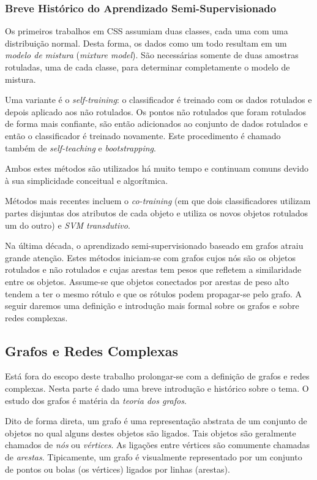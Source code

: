 \documentclass[12pt]{article}
\begin{document}
\subsubsection{Breve Histórico do Aprendizado Semi-Supervisionado}
Os primeiros trabalhos em CSS assumiam duas classes, cada uma com uma distribuição normal. Desta forma, os dados como um todo resultam em um \emph{modelo de mistura} (\emph{mixture model}). São necessárias somente de duas amostras rotuladas, uma de cada classe, para determinar completamente o modelo de mistura.

Uma variante é o \emph{self-training}: o classificador é treinado com os dados rotulados e depois aplicado aos não rotulados. Os pontos não rotulados que foram rotulados de forma mais confiante, são então adicionados ao conjunto de dados rotulados e então o classificador é treinado novamente. Este procedimento é chamado também de \emph{self-teaching} e \emph{bootstrapping}.

Ambos estes métodos são utilizados há muito tempo e continuam comuns devido à sua simplicidade conceitual e algorítmica.

Métodos mais recentes incluem o \emph{co-training} (em que dois classificadores utilizam partes disjuntas dos atributos de cada objeto e utiliza os novos objetos rotulados um do outro) e \emph{SVM transdutivo}.

Na última década, o aprendizado semi-supervisionado baseado em grafos atraiu grande atenção. Estes métodos iniciam-se com grafos cujos nós são os objetos rotulados e não rotulados e cujas arestas tem pesos que refletem a similaridade entre os objetos. Assume-se que objetos conectados por arestas de peso alto tendem a ter o mesmo rótulo e que os rótulos podem propagar-se pelo grafo. A seguir daremos uma definição e introdução mais formal sobre os grafos e sobre redes complexas.

\subsection{Grafos e Redes Complexas}
Está fora do escopo deste trabalho prolongar-se com a definição de grafos e redes complexas. Nesta parte é dado uma breve introdução e histórico sobre o tema. O estudo dos grafos é matéria da \emph{teoria dos grafos}.

Dito de forma direta, um grafo é uma representação abstrata de um conjunto de objetos no qual alguns destes objetos são ligados. Tais objetos são geralmente chamados de \emph{nós} ou \emph{vértices}. As ligações entre vértices são comumente chamadas de \emph{arestas}. Tipicamente, um grafo é visualmente representado por um conjunto de pontos ou bolas (os vértices) ligados por linhas (arestas).
\end{document}
